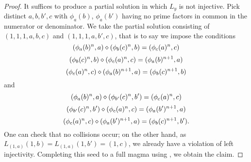 \begin{proof} It suffices to produce a partial solution in which $L_y$ is not injective. Pick distinct $a, b, b', c$ with $\phi_a(b)$, $\phi_a(b')$ having no prime factors in common in the numerator or denominator.  We take the partial solution consisting of $(1,1,1,a,b,c)$ and $(1,1,1,a,b',c)$, that is to say we impose the conditions
$$ (\phi_a(b)^n,a) \diamond (\phi_b(c)^n,b) = (\phi_c(a)^n,c)$$
$$ (\phi_b(c)^n,b) \diamond (\phi_c(a)^n,c) = (\phi_a(b)^{n+1}, a)$$
$$ (\phi_c(a)^n,c) \diamond (\phi_a(b)^{n+1}, a) = (\phi_b(c)^{n+1},b)$$
and
$$ (\phi_a(b)^n,a) \diamond (\phi_{b'}(c)^n,b') = (\phi_c(a)^n,c)$$
$$ (\phi_{b'}(c)^n,b') \diamond (\phi_c(a)^n,c) = (\phi_a(b')^{n+1}, a)$$
$$ (\phi_c(a)^n,c) \diamond (\phi_{a}(b')^{n+1}, a) = (\phi_b(c)^{n+1},b').$$
One can check that no collisions occur; on the other hand, as $L_{(1,a)} (1,b) = L_{(1,a)} (1,b') = (1,c)$, we already have a violation of left injectivity.  Completing this seed to a full magma using , we obtain the claim.
\end{proof}
